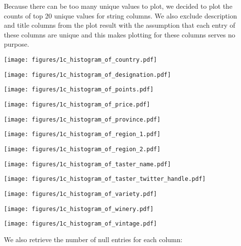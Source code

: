 \documentclass[11pt]{article}
\begin{document}
Because there can be too many unique values to plot, we decided to plot the counts of top 20 unique values for string columns. We also exclude description and title columns from the plot result with the assumption that each entry of these columns are unique and this makes plotting for these columns serves no purpose.

\texttt{[image: figures/1c\_histogram\_of\_country.pdf]}

\texttt{[image: figures/1c\_histogram\_of\_designation.pdf]}

\texttt{[image: figures/1c\_histogram\_of\_points.pdf]}

\texttt{[image: figures/1c\_histogram\_of\_price.pdf]}

\texttt{[image: figures/1c\_histogram\_of\_province.pdf]}

\texttt{[image: figures/1c\_histogram\_of\_region\_1.pdf]}

\texttt{[image: figures/1c\_histogram\_of\_region\_2.pdf]}

\texttt{[image: figures/1c\_histogram\_of\_taster\_name.pdf]}

\texttt{[image: figures/1c\_histogram\_of\_taster\_twitter\_handle.pdf]}

\texttt{[image: figures/1c\_histogram\_of\_variety.pdf]}

\texttt{[image: figures/1c\_histogram\_of\_winery.pdf]}

\texttt{[image: figures/1c\_histogram\_of\_vintage.pdf]}

We also retrieve the number of null entries for each column:
\end{document}
